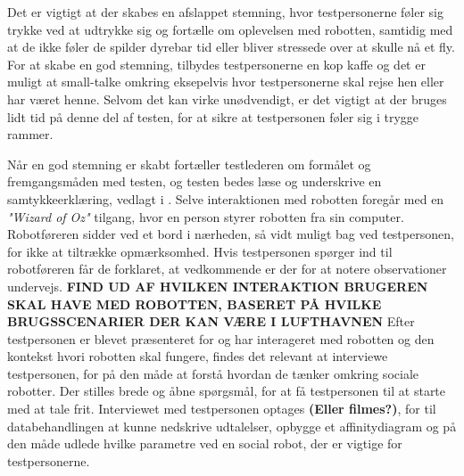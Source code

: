 Det er vigtigt at der skabes en afslappet stemning, hvor testpersonerne føler sig trykke ved at udtrykke sig og fortælle om oplevelsen med robotten, samtidig med at de ikke føler de spilder dyrebar tid eller bliver stressede over at skulle nå et fly. For at skabe en god stemning, tilbydes testpersonerne en kop kaffe og det er muligt at small-talke omkring eksepelvis hvor testpersonerne skal rejse hen eller har været henne. Selvom det kan virke unødvendigt, er det vigtigt at der bruges lidt tid på denne del af testen, for at sikre at testpersonen føler sig i trygge rammer. 

Når en god stemning er skabt fortæller testlederen om formålet og fremgangsmåden med testen, og testen bedes læse og underskrive en samtykkeerklæring, vedlagt i .\blankline
%
Selve interaktionen med robotten foregår med en \textit{"Wizard of Oz"} tilgang, hvor en person styrer robotten fra sin computer. Robotføreren sidder ved et bord i nærheden, så vidt muligt bag ved testpersonen, for ikke at tiltrække opmærksomhed. Hvis testpersonen spørger ind til robotføreren får de forklaret, at vedkommende er der for at notere observationer undervejs. 
\textbf{FIND UD AF HVILKEN INTERAKTION BRUGEREN SKAL HAVE MED ROBOTTEN, BASERET PÅ HVILKE BRUGSSCENARIER DER KAN VÆRE I LUFTHAVNEN} \blankline
%
Efter testpersonen er blevet præsenteret for og har interageret med robotten og den kontekst hvori robotten skal fungere, findes det relevant at interviewe testpersonen, for på den måde at forstå hvordan de tænker omkring sociale robotter. Der stilles brede og åbne spørgsmål, for at få testpersonen til at starte med at tale frit. Interviewet med testpersonen optages \textbf{(Eller filmes?)}, for til databehandlingen at kunne nedskrive udtalelser, opbygge et affinitydiagram og på den måde udlede hvilke parametre ved en social robot, der er vigtige for testpersonerne.
